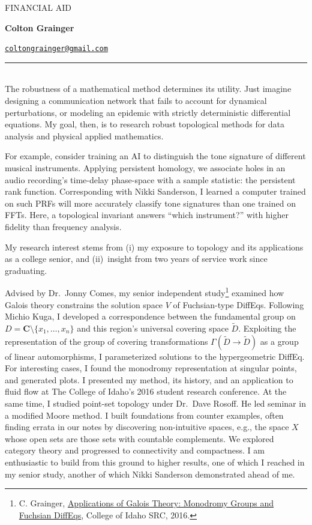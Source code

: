 \documentclass{article}
\makeatletter
\newcommand\textbox[1]{\parbox{.33\textwidth}{#1}}
\newcommand\printheader{\noindent
  \textbox{FINANCIAL AID}
  \textbox{\centerline{\large\bf Colton Grainger}}
  \textbox{\raggedleft \href{mailto:coltongrainger@gmail.com}{\texttt{coltongrainger@gmail.com}}\ }

  \vspace{-15pt}
  \noindent
  \rule{\textwidth}{1pt}\\
}
\makeatother
\begin{document}
 

\printheader

The robustness of a mathematical method determines its utility. Just
imagine designing a communication network that fails to account for
dynamical perturbations, or modeling an epidemic with strictly
deterministic differential equations. My goal, then, is to research
robust topological methods for data analysis and physical applied
mathematics.

For example, consider training an AI to distinguish the tone signature
of different musical instruments. Applying persistent homology, we
associate holes in an audio recording's time-delay phase-space with a
sample statistic: the persistent rank function. Corresponding with Nikki
Sanderson, I learned a computer trained on such PRFs will more
accurately classify tone signatures than one trained on FFTs. Here, a
topological invariant answers ``which instrument?'' with higher fidelity
than frequency analysis.

My research interest stems from (i) my exposure to topology and its
applications as a college senior, and (ii)~insight from two years of
service work since graduating.

Advised by Dr.~Jonny Comes, my senior independent study\footnote{C.
  Grainger,
  \href{http://coltongrainger.com/documents/cgrainger_coursework_galois_poster.pdf}{Applications
  of Galois Theory: Monodromy Groups and Fuchsian DiffEqs}, College of Idaho SRC, 2016.}
examined how Galois theory constrains the solution space \(V\) of
Fuchsian-type DiffEqs. Following Michio Kuga, I developed a
correspondence between the fundamental group on
\(D = \mathbf{C}\setminus\{x_1,\ldots,x_n\}\) and this region's
universal covering space \(\tilde{D}\). Exploiting the representation of
the group of covering transformations
\(\Gamma(\tilde{D} \to \tilde{D})\) as a group of linear automorphisms,
I parameterized solutions to the hypergeometric DiffEq. For
interesting cases, I found the monodromy representation at singular
points, and generated plots. I presented my method, its history, and an
application to fluid flow at The College of Idaho's 2016 student
research conference. At the same time, I studied point-set topology
under Dr.~Dave Rosoff. He led seminar in a modified Moore method.
I built foundations from counter examples, often finding errata in our notes by
discovering non-intuitive spaces, e.g., the space \(X\) whose
open sets are those sets with countable complements.
We explored category theory and progressed to connectivity and compactness. I am
enthusiastic to build from this ground to higher results,
one of which I reached in my senior study, another of which Nikki
Sanderson demonstrated ahead of me.
\end{document}
